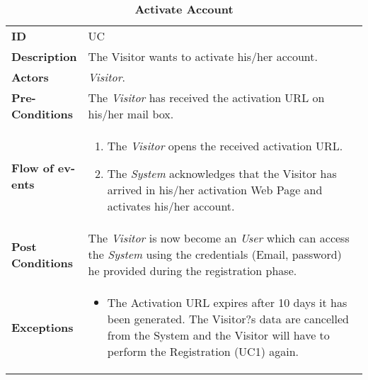 
\begin{longtable}{|p{0.2\linewidth} p{0.8\linewidth}|}
	\captionsetup{labelformat=empty} %
	\caption{\textbf{Activate Account}} %
	\label{UC_Activate}%
	\\ \hline %
	
	\textbf{ID} & UC\theUseCaseIdCounter \\ \hline
	\textbf{Description} & The Visitor wants to activate his/her account. \\ \hline
	\textbf{Actors} & \emph{Visitor}.\\ \hline
	\textbf{Pre-Conditions} & The \emph{Visitor} has received the activation URL on his/her mail box. \\ \hline
	\textbf{Flow of ev-ents} & 
	\begin{enumerate}
		\item The \emph{Visitor} opens the received activation URL.
		\item The \emph{System} acknowledges that the Visitor has arrived in his/her activation Web Page and activates his/her account.
	\end{enumerate}	 \\ \hline
	\textbf{Post Conditions} & The \emph{Visitor} is now become an \emph{User} which can access the \emph{System} using the credentials (Email, password) he provided during the registration phase. \\ \hline
	\textbf{Exceptions} & 
	\begin{itemize}
		\item The Activation URL expires after 10 days it has been generated. The Visitor?s data are cancelled from the System and the Visitor will have to perform the Registration (UC1) again.
	\end{itemize} \\ \hline
\end{longtable}


